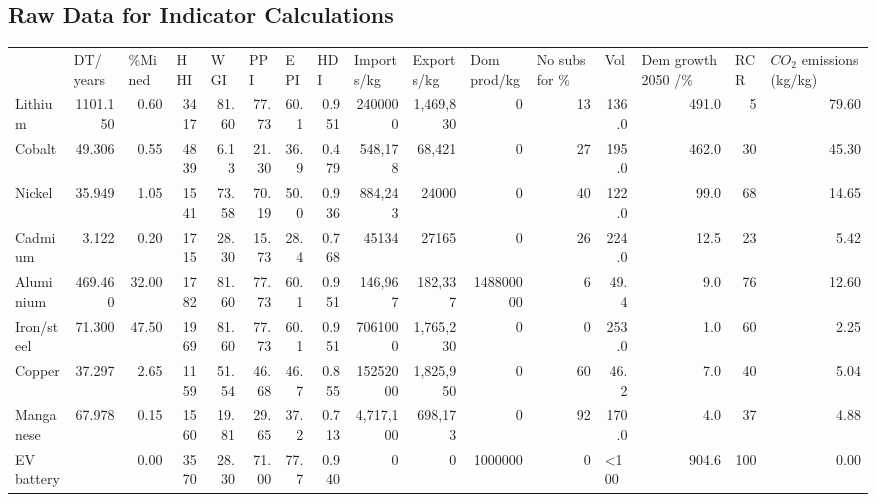 \documentclass{article}
\begin{document}


\newpage
{}
\begin{landscape}
    \Huge 
    \appendix
\section{Raw Data for Indicator Calculations}

\begin{table}[htbp]
  \centering
  \scriptsize
    \begin{tabular}{lrrrrrrrrrrrlrrr}
          & \multicolumn{1}{l}{DT/ years} & \multicolumn{1}{l}{\%Mined} & \multicolumn{1}{l}{HHI} & \multicolumn{1}{l}{WGI} & \multicolumn{1}{l}{PPI} & \multicolumn{1}{l}{EPI} & \multicolumn{1}{l}{HDI} & \multicolumn{1}{l}{Imports/kg} & \multicolumn{1}{l}{Exports/kg} & \multicolumn{1}{l}{Dom prod/kg} & \multicolumn{1}{l}{No subs for \%} & Vol & \multicolumn{1}{l}{Dem growth 2050 /\%} & \multicolumn{1}{l}{RCR} & \multicolumn{1}{l}{$CO_2$ emissions (kg/kg)} \\
    Lithium & 1101.150 & 0.60  & 3417  & 81.60 & 77.73 & 60.1  & 0.951 & 2400000 & 1,469,830 & 0     & 13    & \multicolumn{1}{r}{136.0} & 491.0 & 5     & 79.60 \\
    Cobalt & 49.306 & 0.55  & 4839  & 6.13  & 21.30 & 36.9  & 0.479 & 548,178 & \textcolor[rgb]{ .2,  .2,  .2}{68,421} & 0     & 27    & \multicolumn{1}{r}{195.0} & 462.0 & 30    & 45.30 \\
    Nickel & 35.949 & 1.05  & 1541  & 73.58 & 70.19 & 50.0  & 0.936 & 884,243 & 24000 & 0     & 40    & \multicolumn{1}{r}{122.0} & 99.0  & 68    & 14.65 \\
    Cadmium & 3.122 & 0.20  & 1715  & 28.30 & 15.73 & 28.4  & 0.768 & 45134 & 27165 & 0     & 26    & \multicolumn{1}{r}{224.0} & 12.5  & 23    & 5.42 \\
    Aluminium & 469.460 & 32.00 & 1782  & 81.60 & 77.73 & 60.1  & 0.951 & 146,967	 & \textcolor[rgb]{ .2,  .2,  .2}{182,337} & 148800000 & 6     & \multicolumn{1}{r}{49.4} & 9.0   & 76    & 12.60 \\
    Iron/steel & 71.300 & 47.50 & 1969  & 81.60 & 77.73 & 60.1  & 0.951 & 7061000 & \textcolor[rgb]{ .2,  .2,  .2}{1,765,230} & 0     & 0     & \multicolumn{1}{r}{253.0} & 1.0   & 60    & 2.25 \\
    Copper & 37.297 & 2.65  & 1159  & 51.54 & 46.68 & 46.7  & 0.855 & 15252000 & 1,825,950 & 0     & 60    & \multicolumn{1}{r}{46.2} & 7.0   & 40    & 5.04 \\
    Manganese & 67.978 & 0.15  & 1560  & 19.81 & 29.65 & 37.2  & 0.713 & 4,717,100 & 698,173 & 0     & 92    & \multicolumn{1}{r}{170.0} & 4.0   & 37    & 4.88 \\
    EV battery  &       & 0.00  & 3570  & 28.30 & 71.00 & \textcolor[rgb]{ .133,  .133,  .133}{77.7} & 0.940 & 0     & 0     & 1000000 & 0     & <100  & 904.6 & 100   & 0.00 \\
    \end{tabular}%


\end{table}
\end{landscape}
\end{document}
